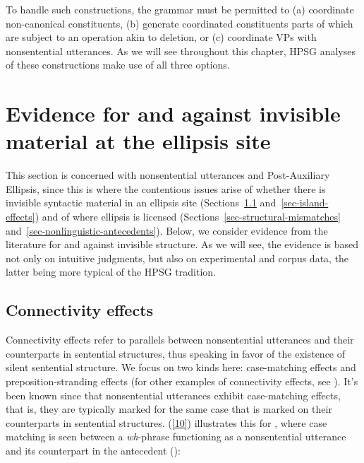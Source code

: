  To handle such constructions, the grammar must be permitted to (a) coordinate non-canonical constituents, (b) generate coordinated constituents parts of which are subject to an operation akin to deletion, or (c) coordinate VPs with nonsentential utterances. As we will see throughout this chapter, HPSG analyses of these constructions make use of all three options.

\section{Evidence for and against invisible material at the ellipsis site}
\label{sec-evidence-for-invisible-material}

This section is concerned with nonsentential utterances and Post-Auxiliary Ellipsis, since this is where the contentious issues arise of
 whether there is invisible syntactic material in an ellipsis site (Sections~\ref{sec-connectivity-effects} and~\ref{sec-island-effects}) and of where ellipsis is licensed (Sections~\ref{sec-structural-mismatches} and~\ref{sec-nonlinguistic-antecedents}).  Below, we consider evidence from the literature for and against invisible structure. As we will see, the evidence is based not only on intuitive judgments, but also on experimental and corpus data, the latter being more typical of the HPSG tradition.


\subsection{Connectivity effects}
\label{sec-connectivity-effects}

Connectivity effects refer to parallels between nonsentential utterances and their counterparts in sentential structures, thus speaking in favor of the existence of silent sentential structure. We focus on two kinds here: case-matching effects and preposition-stranding effects (for other examples of connectivity effects, see \citealt{Ginzburg2018}). It's been known since \citet{Ross1967} that nonsentential utterances exhibit case-matching effects, that is, they are typically marked for the same case that is marked on their counterparts in sentential structures. (\ref{10}) illustrates this for , where case matching is seen between a \emph{wh}-phrase functioning as a nonsentential utterance and its counterpart in the antecedent (\citealt[663]{Merchant2005-proc}):

